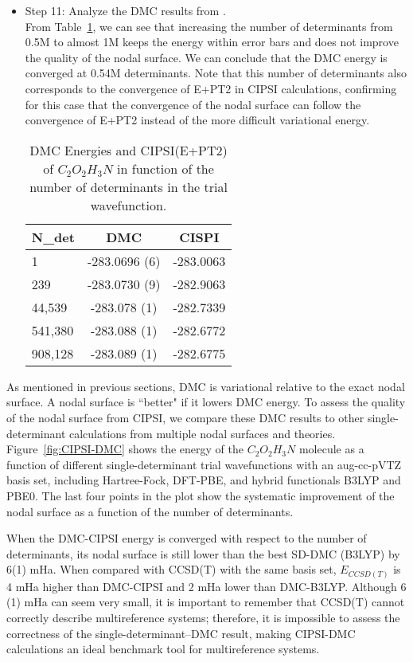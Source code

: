 \begin{itemize}
\item Step 11: Analyze the DMC results from \qmcpack. \\
From Table~\ref{TAB:CIPSI-DMC}, we can see that increasing the number
of determinants from 0.5M to almost 1M keeps the energy
within error bars and does not improve the quality of the nodal
surface. We can conclude that the DMC energy is converged at 0.54M
determinants. Note that this number of determinants
also corresponds to the convergence of E+PT2 in CIPSI calculations,
confirming for this case that the convergence of the nodal surface can
follow the convergence of E+PT2 instead of the more difficult
variational energy.


\begin{table}[t]
\centering
\caption{DMC Energies and CIPSI(E+PT2) of $C_2O_2H_3N$ in function of the number of determinants in the trial wavefunction.}
\label{TAB:CIPSI-DMC}
\begin{tabular}{l|c|c}
\hline 
N\_det & DMC& CISPI\\
\hline
1 & -283.0696 (6)&-283.0063\\
239 & -283.0730 (9)&-282.9063\\
44,539 & -283.078 (1)&-282.7339\\
541,380 & -283.088 (1)&-282.6772\\
908,128& -283.089  (1)&-282.6775\end{tabular}
\end{table}

\end{itemize}

As mentioned in previous sections, DMC is variational relative to the
exact nodal surface. A nodal surface is ``better" if it lowers DMC
energy. To assess the quality of the nodal surface from CIPSI, we
compare these DMC results to other single-determinant calculations
from multiple nodal surfaces and theories. Figure~\ref{fig:CIPSI-DMC}
shows the energy of the $C_2O_2H_3N$ molecule as a function of
different single-determinant trial wavefunctions with an
aug-cc-pVTZ basis set, including Hartree-Fock, DFT-PBE, and hybrid
functionals B3LYP and PBE0. The last four points in the plot show the
systematic improvement of the nodal surface as a function of the
number of determinants. 

When the DMC-CIPSI energy is converged with respect to the number of
determinants, its nodal surface is still lower than the best SD-DMC
(B3LYP) by 6(1) mHa. When compared with CCSD(T) with the same basis set,
$E_{CCSD(T)}$ is 4 mHa higher than DMC-CIPSI and 2 mHa lower than
DMC-B3LYP. Although 6 (1) mHa can seem very small, it is important to remember that CCSD(T) cannot correctly describe multireference systems; therefore, it is impossible to assess the
correctness of the single-determinant--DMC result, making CIPSI-DMC calculations an
ideal benchmark tool for multireference systems.

